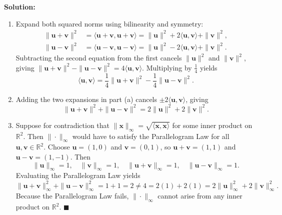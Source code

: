 \documentclass[11pt, letterpaper]{article}
\theoremstyle{definition}
\theoremstyle{remark}
\begin{document}
\textbf{Solution:}
\begin{enumerate}[label=(\alph*)]
    \item Expand both squared norms using bilinearity and symmetry:
    \begin{align*}
    \|\mathbf{u} + \mathbf{v}\|^2 &= \langle \mathbf{u} + \mathbf{v}, \mathbf{u} + \mathbf{v} \rangle = \|\mathbf{u}\|^2 + 2\langle \mathbf{u}, \mathbf{v} \rangle + \|\mathbf{v}\|^2, \\
    \|\mathbf{u} - \mathbf{v}\|^2 &= \langle \mathbf{u} - \mathbf{v}, \mathbf{u} - \mathbf{v} \rangle = \|\mathbf{u}\|^2 - 2\langle \mathbf{u}, \mathbf{v} \rangle + \|\mathbf{v}\|^2.
    \end{align*}
    Subtracting the second equation from the first cancels $\|\mathbf{u}\|^2$ and $\|\mathbf{v}\|^2$, giving $\|\mathbf{u} + \mathbf{v}\|^2 - \|\mathbf{u} - \mathbf{v}\|^2 = 4\langle \mathbf{u}, \mathbf{v} \rangle$. Multiplying by $\frac{1}{4}$ yields
    \[
    \langle \mathbf{u}, \mathbf{v} \rangle = \frac{1}{4}\|\mathbf{u} + \mathbf{v}\|^2 - \frac{1}{4}\|\mathbf{u} - \mathbf{v}\|^2.
    \]
    \item Adding the two expansions in part (a) cancels $\pm 2\langle \mathbf{u}, \mathbf{v} \rangle$, giving
    \[
    \|\mathbf{u} + \mathbf{v}\|^2 + \|\mathbf{u} - \mathbf{v}\|^2 = 2\|\mathbf{u}\|^2 + 2\|\mathbf{v}\|^2.
    \]
    \item Suppose for contradiction that $\|\mathbf{x}\|_\infty = \sqrt{\langle \mathbf{x}, \mathbf{x} \rangle}$ for some inner product on $\mathbb{R}^2$. Then $\|\cdot\|_\infty$ would have to satisfy the Parallelogram Law for all $\mathbf{u}, \mathbf{v} \in \mathbb{R}^2$. Choose $\mathbf{u} = (1, 0)$ and $\mathbf{v} = (0, 1)$, so $\mathbf{u} + \mathbf{v} = (1, 1)$ and $\mathbf{u} - \mathbf{v} = (1, -1)$. Then
    \[
    \|\mathbf{u}\|_\infty = 1, \quad \|\mathbf{v}\|_\infty = 1, \quad \|\mathbf{u} + \mathbf{v}\|_\infty = 1, \quad \|\mathbf{u} - \mathbf{v}\|_\infty = 1.
    \]
    Evaluating the Parallelogram Law yields
    \[
    \|\mathbf{u} + \mathbf{v}\|_\infty^2 + \|\mathbf{u} - \mathbf{v}\|_\infty^2 = 1 + 1 = 2 \neq 4 = 2(1) + 2(1) = 2\|\mathbf{u}\|_\infty^2 + 2\|\mathbf{v}\|_\infty^2.
    \]
    Because the Parallelogram Law fails, $\|\cdot\|_\infty$ cannot arise from any inner product on $\mathbb{R}^2$. $\blacksquare$
\end{enumerate}

\medskip
\end{document}
